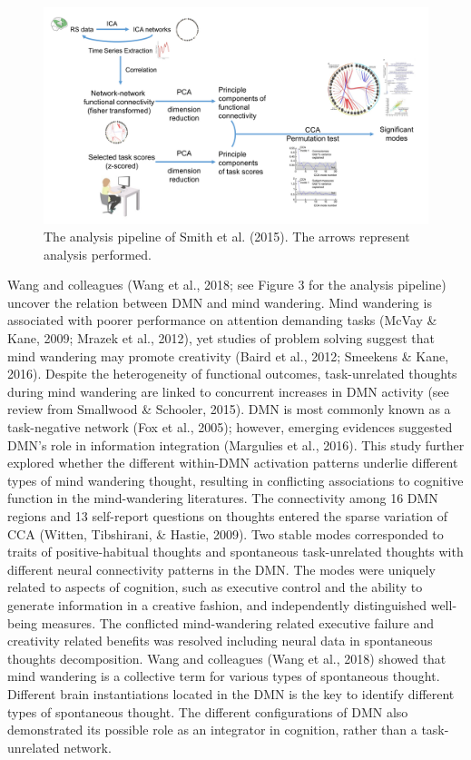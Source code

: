 \begin{figure}[H]
	\centering
	\includegraphics[width=1\textwidth]{cca/image/ccafig2.png}
	\caption{The analysis pipeline of Smith et al. (2015). The arrows represent analysis performed.}

	\label{fig:methods:fig2}
\end{figure}

Wang and colleagues (Wang et al., 2018; see Figure 3 for the analysis pipeline) uncover the relation between DMN and mind wandering. Mind wandering is associated with poorer performance on attention demanding tasks (McVay \& Kane, 2009; Mrazek et al., 2012), yet studies of problem solving suggest that mind wandering may promote creativity (Baird et al., 2012; Smeekens \& Kane, 2016). Despite the heterogeneity of functional outcomes, task-unrelated thoughts during mind wandering are linked to concurrent increases in DMN activity (see review from Smallwood \& Schooler, 2015). DMN is most commonly known as a task-negative network (Fox et al., 2005); however, emerging evidences suggested DMN’s role in information integration (Margulies et al., 2016). This study further explored whether the different within-DMN activation patterns underlie different types of mind wandering thought, resulting in conflicting associations to cognitive function in the mind-wandering literatures. The connectivity among 16 DMN regions and 13 self-report questions on thoughts entered the sparse variation of CCA (Witten, Tibshirani, \& Hastie, 2009). Two stable modes corresponded to traits of positive-habitual thoughts and spontaneous task-unrelated thoughts with different neural connectivity patterns in the DMN. The modes were uniquely related to aspects of cognition, such as executive control and the ability to generate information in a creative fashion, and independently distinguished well-being measures. The conflicted mind-wandering related executive failure and creativity related benefits was resolved including neural data in spontaneous thoughts decomposition. Wang and colleagues (Wang et al., 2018) showed that mind wandering is a collective term for various types of spontaneous thought. Different brain instantiations located in the DMN is the key to identify different types of spontaneous thought. The different configurations of DMN also demonstrated its possible role as an integrator in cognition, rather than a task-unrelated network.

